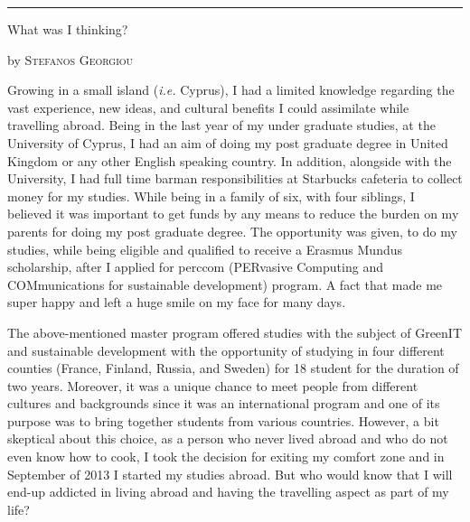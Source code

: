 \documentclass[10pt,a4paper]{article} %
\newcommand{\SepRule}{\noindent	%
\begin{center}
\rule{250pt}{1pt} %
\end{center}
}
\newcommand{\NewsItem}[1]{ %
\usefont{T1}{fvs}{n}{n} %
\vspace{24pt}\large #1\vspace{3pt} %
\par \normalsize \normalfont}
\newcommand{\NewsAuthor}[1]{ %
\hfill by \textsc{#1} \vspace{20pt} %
\par \normalfont}
\begin{document}
\vspace{0.5cm}
\SepRule %
\vspace{0.5cm}

\begin{multicols}{3} %


\NewsItem{What was I thinking?}
\NewsAuthor{Stefanos Georgiou}

Growing in a small island (\textit{i.e.} Cyprus), I had a limited knowledge regarding 
the vast experience, new ideas, and cultural benefits I could assimilate while 
travelling abroad. 
Being in the last year of my under graduate studies, at the University of Cyprus, 
I had an aim of doing my post graduate degree in United Kingdom or any other 
English speaking country. 
In addition, alongside with the University, I had full time barman responsibilities 
at Starbucks cafeteria to collect money for my studies. 
While being in a family of six, with four siblings, I believed it was important 
to get funds by any means to reduce the burden on my parents for doing my post graduate 
degree. 
The opportunity was given, to do my studies, while being eligible and qualified to 
receive a Erasmus Mundus scholarship, after I applied for {\sc perccom} (PERvasive 
Computing and COMmunications for sustainable development) program. 
A fact that made me super happy and left a huge smile on my face for many days.


The above-mentioned master program offered studies with the subject of GreenIT and 
sustainable development with the opportunity of studying in four different counties 
(France, Finland, Russia, and Sweden) for 18 student for the duration of two years. 
Moreover, it was a unique chance to meet people from different cultures and backgrounds 
since it was an international program and one of its purpose was to bring together 
students from various countries. 
However, a bit skeptical about this choice, as a person who never lived abroad and 
who do not even know how to cook, I took the decision for exiting my comfort zone 
and in September of 2013 I started my studies abroad. 
But who would know that I will end-up addicted in living abroad and having the 
travelling aspect as part of my life?



\end{multicols}
\end{document}
